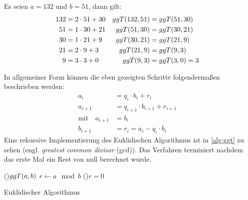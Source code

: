 \begin{example}
  Es seien $a=132$ und $b=51$, dann gilt:
  \begin{align*}
    132 & = 2 \cdot 51 + 30 & ggT(132,51) & = ggT(51,30)   \\
    51  & = 1 \cdot 30 + 21 & ggT(51,30)  & = ggT(30,21)   \\
    30  & = 1 \cdot 21 + 9  & ggT(30,21)  & = ggT(21,9)    \\
    21  & = 2 \cdot 9 + 3   & ggT(21,9)   & = ggT(9,3)     \\
    9   & = 3 \cdot 3 + 0   & ggT(9,3)    & = ggT(3,0) = 3
  \end{align*}
\end{example}
\noindent
In allgemeiner Form können die eben gezeigten Schritte folgendermaßen beschrieben werden:
\begin{equation}
  \label{eq:euklid}
  \begin{split}
    a_i     & = q_i \cdot b_i + r_i \\
    a_{i+1} & = q_{i+1} \cdot b_{i+1} + r_{i+1} \\
    \text{mit} \quad a_{i+1} & = b_i \\
    b_{i+1} & = r_i = a_i - q_i \cdot b_i
  \end{split}
\end{equation}
Eine rekursive Implementierung des Euklidischen Algorithmus ist in \autoref{alg:ggt}
zu sehen (engl. \textit{greatest common divisor} (gcd)).
Das Verfahren terminiert nachdem das erste Mal ein Rest von null berechnet wurde.
\begin{algorithm}
  \DontPrintSemicolon
  \BlankLine
  \Fn(){$ggT(a,b)$}{
    $r \leftarrow a \mod{b}$\;
    \If(){$r = 0$}{
    }
  }
  \caption{Euklidischer Algorithmus}
  \label{alg:ggt}
\end{algorithm}
